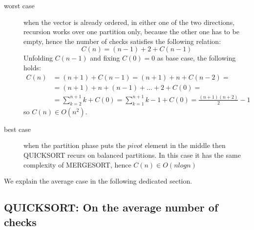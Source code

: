 \begin{description}
\item[worst case] when the vector is already ordered, in either one of the
  two directions, recursion works over one partition only, because the
  other one has to be empty, hence the number of checks satisfies
  the following relation:
  \begin{displaymath}
    C(n) = (n-1)+2 + C(n-1)
  \end{displaymath}
  Unfolding $C(n-1)$ and fixing $C(0) = 0$ as base case, the following holds:
  \begin{displaymath}
    \begin{split}
      C(n) &= (n+1) + C(n-1) = (n+1) + n + C(n-2) = \\
      &= (n+1) + n + (n-1) + \ldots + 2 + C(0) = \\
      &= \sum_{k=2}^{n+1}{k} + C(0) = \sum_{k=1}^{n+1}{k} -1 + C(0) =
      \frac{(n+1)(n+2)}{2} - 1
    \end{split}
  \end{displaymath}
  so $C(n) \in O(n^2)$.
\item[best case] when the partition phase puts the $pivot$ element
    in the middle then QUICKSORT recurs on balanced partitions. In this
  case it has the same complexity of MERGESORT, hence $C(n) \in O(n
  logn)$
\end{description}
We explain the average case in the following dedicated section.

\subsection{QUICKSORT: On the average number of checks}

